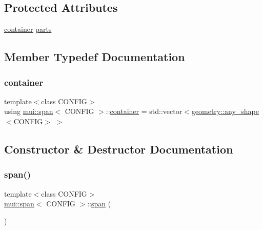 \subsection*{Protected Attributes}
\begin{DoxyCompactItemize}
\item 
\hyperlink{classmui_1_1span_a255f188b78cfdd6c0be79119c4bcfe82}{container} \hyperlink{classmui_1_1span_a3ddce7b2d0f2a46b88f8fd4b4eedf3df}{parts}
\end{DoxyCompactItemize}


\subsection{Member Typedef Documentation}
\mbox{\label{classmui_1_1span_a255f188b78cfdd6c0be79119c4bcfe82}} 
\subsubsection{\texorpdfstring{container}{container}}
{\footnotesize\ttfamily template$<$class C\+O\+N\+F\+IG$>$ \\
using \hyperlink{classmui_1_1span}{mui\+::span}$<$ C\+O\+N\+F\+IG $>$\+::\hyperlink{classmui_1_1span_a255f188b78cfdd6c0be79119c4bcfe82}{container} =  std\+::vector$<$\hyperlink{classmui_1_1geometry_1_1any__shape}{geometry\+::any\+\_\+shape}$<$C\+O\+N\+F\+IG$>$ $>$\hspace{0.3cm}{\ttfamily [protected]}}



\subsection{Constructor \& Destructor Documentation}
\mbox{\label{classmui_1_1span_a0d3a14ad0a07096e4b4f55be5df00029}} 
\subsubsection{\texorpdfstring{span()}{span()}}
{\footnotesize\ttfamily template$<$class C\+O\+N\+F\+IG$>$ \\
\hyperlink{classmui_1_1span}{mui\+::span}$<$ C\+O\+N\+F\+IG $>$\+::\hyperlink{classmui_1_1span}{span} (\begin{DoxyParamCaption}{ }\end{DoxyParamCaption})\hspace{0.3cm}{\ttfamily [inline]}}




